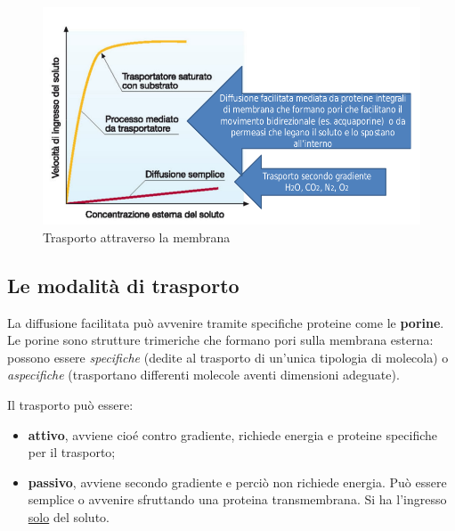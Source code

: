 \documentclass[11pt]{book}
\begin{document}
\begin{figure}[htp]
\centering
\includegraphics[scale=0.3]{img/Trasporto attraverso la membrana.png}
\caption{Trasporto attraverso la membrana}
\label{}
\end{figure}


\subsection{Le modalità di trasporto}
La diffusione facilitata può avvenire tramite specifiche proteine come le \textbf{porine}. Le porine sono strutture trimeriche che formano pori sulla membrana esterna: possono essere \emph{specifiche} (dedite al trasporto di un’unica tipologia di molecola) o \emph{aspecifiche} (trasportano differenti molecole aventi dimensioni adeguate).

\vspace{1em}
Il trasporto può essere:
\begin{itemize}
\item \textbf{attivo}, avviene cioé contro gradiente, richiede energia e proteine specifiche per il trasporto;
\item \textbf{passivo}, avviene secondo gradiente e perciò non richiede energia. Può essere semplice o avvenire sfruttando una proteina transmembrana. Si ha l'ingresso \underline{solo} del soluto.
\end{itemize}
\end{document}

